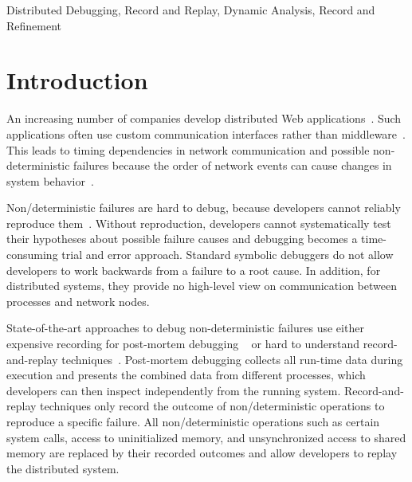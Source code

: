 \documentclass[preprint,3p]{elsarticle}
\newcommand{\dockeywords}{Distributed Debugging, Record and Replay,
  Dynamic Analysis, Record and Refinement}
\begin{document}
\begin{frontmatter}
\begin{abstract}


\end{abstract}

\begin{keyword}
\dockeywords
\end{keyword}

\end{frontmatter}

\section{Introduction}
\label{sec:introduction}

An increasing number of companies develop distributed Web
applications~\cite{kondo2009cost}. 
Such applications
often use custom communication interfaces rather than
middleware~\cite{Nadiminti}. 
This leads to
timing dependencies in network communication and possible 
non-deterministic failures because the order of network events can cause 
changes in system behavior~\cite{Artho2003}.

Non\-/deterministic failures are hard to debug, because developers
cannot reliably reproduce them~\cite{zeller2009programs}. Without
reproduction, developers cannot systematically test their hypotheses
about possible failure causes and debugging becomes a time-consuming
trial and error approach. Standard symbolic debuggers do not allow
developers to work backwards from a failure to a root cause. In
addition, for distributed systems, they provide no high-level view on
communication between processes and network nodes.

State-of-the-art approaches to debug non-deterministic failures
use either expensive recording for post-mortem debugging
~\cite{Stanley2009} or hard to understand record-and-replay 
techniques~\cite{Geels2006Replay}. Post-mortem debugging
collects all run-time data during execution and presents the combined
data from different processes, which developers can then inspect
independently from the running system. Record-and-replay techniques
only record the outcome of non\-/deterministic operations to reproduce 
a specific failure. All non\-/deterministic operations such as certain 
system calls, access to uninitialized memory, and unsynchronized 
access to shared memory are replaced by their recorded outcomes 
and allow developers to replay the distributed system. 
\end{document}
